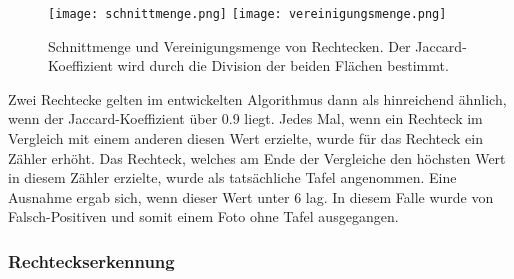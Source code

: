 \begin{figure}[h!]
\texttt{[image: schnittmenge.png]}
\texttt{[image: vereinigungsmenge.png]}
\caption{Schnittmenge und Vereinigungsmenge von Rechtecken. Der Jaccard-Koeffizient wird durch die Division der beiden Flächen bestimmt.}
\label{fig:jaccard}
\end{figure}

Zwei Rechtecke gelten im entwickelten Algorithmus dann als hinreichend ähnlich, wenn der Jaccard-Koeffizient über 0.9 liegt. Jedes Mal, wenn ein Rechteck im Vergleich mit einem anderen diesen Wert erzielte, wurde für das Rechteck ein Zähler erhöht. Das Rechteck, welches am Ende der Vergleiche den höchsten Wert in diesem Zähler erzielte, wurde als tatsächliche Tafel angenommen. Eine Ausnahme ergab sich, wenn dieser Wert unter 6 lag. In diesem Falle wurde von Falsch-Positiven und somit einem Foto ohne Tafel ausgegangen. %

\subsubsection*{Rechteckserkennung}

